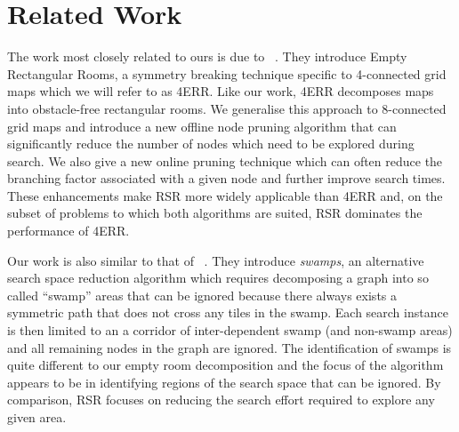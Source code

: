 \section{Related Work}
The work most closely related to ours is due to
\citeauthor{harabor10}~. They introduce Empty Rectangular Rooms, 
a symmetry breaking technique specific to 4-connected grid maps
which we will refer to as 4ERR.
Like our work, 4ERR decomposes maps into obstacle-free rectangular rooms.
We generalise this approach to 8-connected grid maps and introduce a new 
offline node pruning algorithm that can significantly 
reduce the number of nodes which need to be explored during search.
We also give a new online pruning technique which can often reduce the
branching factor associated with a given node and further improve search times.
These enhancements make RSR more widely applicable than 4ERR and, 
on the subset of problems to which both algorithms are suited, 
RSR dominates the performance of 4ERR. 
\par
Our work is also similar to that of \citeauthor{pochter10}~. 
They introduce \emph{swamps}, an alternative search space reduction algorithm
which requires decomposing a graph into so called ``swamp'' areas that can be 
ignored because there always exists a symmetric path that does not cross any 
tiles in the swamp. 
Each search instance is then limited to an a corridor of inter-dependent 
swamp (and non-swamp areas) and all remaining nodes in the graph are ignored.
The identification of swamps is quite different to our empty room decomposition
and the focus of the algorithm appears to be in identifying regions of the
search space that can be ignored.
By comparison, RSR focuses on reducing the search effort required to explore
any given area.
